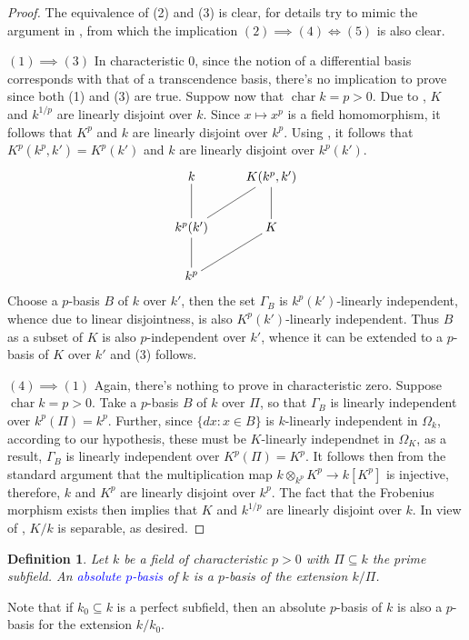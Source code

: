 \documentclass[10pt]{article}
\theoremstyle{thmstyle}
\theoremstyle{defstyle}
\newtheorem{definition}[theorem]{Definition}
\newcommand{\chr}{\operatorname{char}}
\newcommand{\define}[1]{\textcolor{blue}{\textit{#1}}}
\begin{document}
\begin{proof}
    The equivalence of (2) and (3) is clear, for details try to mimic the argument in , from which the implication $(2)\implies(4)\iff (5)$ is also clear. 

    $(1)\implies(3)$ In characteristic $0$, since the notion of a differential basis corresponds with that of a transcendence basis, there's no implication to prove since both (1) and (3) are true. Suppow now that $\chr k = p > 0$. Due to , $K$ and $k^{1/p}$ are linearly disjoint over $k$. Since $x\mapsto x^p$ is a field homomorphism, it follows that $K^p$ and $k$ are linearly disjoint over $k^p$. Using , it follows that $K^p(k^p, k') = K^p(k')$ and $k$ are linearly disjoint over $k^p(k')$.
    \begin{equation*}
        \xymatrix {
            k & K(k^p, k')\\
            k^p(k')\ar@{-}[u]\ar@{-}[ru] & K\ar@{-}[u]\\
            k^p\ar@{-}[u]\ar@{-}[ru]
        }
    \end{equation*}
    Choose a $p$-basis $B$ of $k$ over $k'$, then the set $\Gamma_B$ is $k^p(k')$-linearly independent, whence due to linear disjointness, is also $K^p(k')$-linearly independent. Thus $B$ as a subset of $K$ is also $p$-independent over $k'$, whence it can be extended to a $p$-basis of $K$ over $k'$ and (3) follows.

    $(4)\implies(1)$ Again, there's nothing to prove in characteristic zero. Suppose $\chr k = p > 0$. Take a $p$-basis $B$ of $k$ over $\Pi$, so that $\Gamma_B$ is linearly independent over $k^p(\Pi) = k^p$. Further, since $\{dx\colon x\in B\}$ is $k$-linearly independent in $\Omega_k$, according to our hypothesis, these must be $K$-linearly independnet in $\Omega_K$, as a result, $\Gamma_B$ is linearly independent over $K^p(\Pi) = K^p$. It follows then from the standard argument that the multiplication map $k\otimes_{k^p} K^p\to k[K^p]$ is injective, therefore, $k$ and $K^p$ are linearly disjoint over $k^p$. The fact that the Frobenius morphism exists then implies that $K$ and $k^{1/p}$ are linearly disjoint over $k$. In view of , $K/k$ is separable, as desired.
\end{proof}


\begin{definition}
    Let $k$ be a field of characteristic $p > 0$ with $\Pi\subseteq k$ the prime subfield. An \define{absolute $p$-basis} of $k$ is a $p$-basis of the extension $k/\Pi$.
\end{definition}
Note that if $k_0\subseteq k$ is a perfect subfield, then an absolute $p$-basis of $k$ is also a $p$-basis for the extension $k/k_0$.
\end{document}
